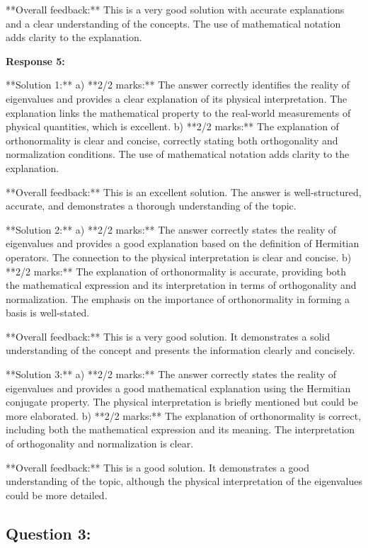 \documentclass[a4paper,11pt]{article}
\begin{document}
**Overall feedback:** This is a very good solution with accurate explanations and a clear understanding of the concepts. The use of mathematical notation adds clarity to the explanation.

\textbf{Response 5:}

**Solution 1:**
a) **2/2 marks:** The answer correctly identifies the reality of eigenvalues and provides a clear explanation of its physical interpretation. The explanation links the mathematical property to the real-world measurements of physical quantities, which is excellent.
b) **2/2 marks:** The explanation of orthonormality is clear and concise, correctly stating both orthogonality and normalization conditions. The use of mathematical notation adds clarity to the explanation.

**Overall feedback:** This is an excellent solution. The answer is well-structured, accurate, and demonstrates a thorough understanding of the topic.

**Solution 2:**
a) **2/2 marks:** The answer correctly states the reality of eigenvalues and provides a good explanation based on the definition of Hermitian operators. The connection to the physical interpretation is clear and concise.
b) **2/2 marks:** The explanation of orthonormality is accurate, providing both the mathematical expression and its interpretation in terms of orthogonality and normalization. The emphasis on the importance of orthonormality in forming a basis is well-stated.

**Overall feedback:** This is a very good solution. It demonstrates a solid understanding of the concept and presents the information clearly and concisely.

**Solution 3:**
a) **2/2 marks:** The answer correctly states the reality of eigenvalues and provides a good mathematical explanation using the Hermitian conjugate property. The physical interpretation is briefly mentioned but could be more elaborated.
b) **2/2 marks:** The explanation of orthonormality is correct, including both the mathematical expression and its meaning. The interpretation of orthogonality and normalization is clear.

**Overall feedback:** This is a good solution. It demonstrates a good understanding of the topic, although the physical interpretation of the eigenvalues could be more detailed.


\subsection*{Question 3:}
\end{document}
